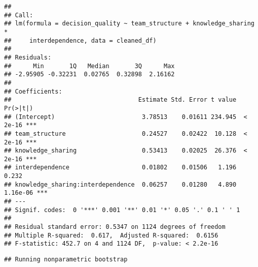 \documentclass[]{article}
\newenvironment{Shaded}{\begin{snugshade}}{\end{snugshade}}
\newcommand{\DataTypeTok}[1]{\textcolor[rgb]{0.13,0.29,0.53}{#1}}
\newcommand{\DecValTok}[1]{\textcolor[rgb]{0.00,0.00,0.81}{#1}}
\newcommand{\FloatTok}[1]{\textcolor[rgb]{0.00,0.00,0.81}{#1}}
\newcommand{\KeywordTok}[1]{\textcolor[rgb]{0.13,0.29,0.53}{\textbf{#1}}}
\newcommand{\NormalTok}[1]{#1}
\newcommand{\OperatorTok}[1]{\textcolor[rgb]{0.81,0.36,0.00}{\textbf{#1}}}
\newcommand{\OtherTok}[1]{\textcolor[rgb]{0.56,0.35,0.01}{#1}}
\newcommand{\StringTok}[1]{\textcolor[rgb]{0.31,0.60,0.02}{#1}}
\begin{document}
\begin{verbatim}
## 
## Call:
## lm(formula = decision_quality ~ team_structure + knowledge_sharing * 
##     interdependence, data = cleaned_df)
## 
## Residuals:
##      Min       1Q   Median       3Q      Max 
## -2.95905 -0.32231  0.02765  0.32898  2.16162 
## 
## Coefficients:
##                                   Estimate Std. Error t value Pr(>|t|)    
## (Intercept)                        3.78513    0.01611 234.945  < 2e-16 ***
## team_structure                     0.24527    0.02422  10.128  < 2e-16 ***
## knowledge_sharing                  0.53413    0.02025  26.376  < 2e-16 ***
## interdependence                    0.01802    0.01506   1.196    0.232    
## knowledge_sharing:interdependence  0.06257    0.01280   4.890 1.16e-06 ***
## ---
## Signif. codes:  0 '***' 0.001 '**' 0.01 '*' 0.05 '.' 0.1 ' ' 1
## 
## Residual standard error: 0.5347 on 1124 degrees of freedom
## Multiple R-squared:  0.617,  Adjusted R-squared:  0.6156 
## F-statistic: 452.7 on 4 and 1124 DF,  p-value: < 2.2e-16
\end{verbatim}

\begin{Shaded}
\end{Shaded}

\begin{verbatim}
## Running nonparametric bootstrap
\end{verbatim}
\end{document}
